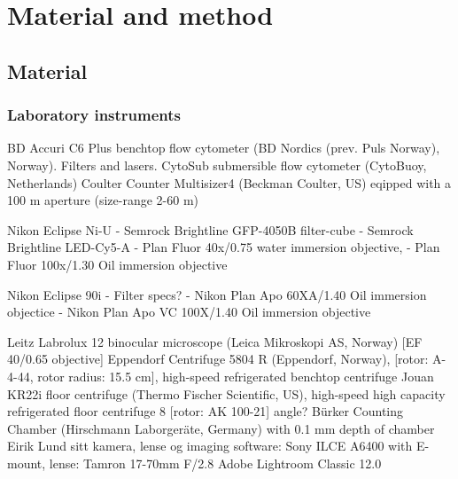 \chapter{Material and method}
\label{chap:m&m}

\section{Material}

\subsection{Laboratory instruments}
BD Accuri C6 Plus benchtop flow cytometer (BD Nordics (prev. Puls Norway), Norway). Filters and lasers.
CytoSub submersible flow cytometer (CytoBuoy, Netherlands)
Coulter Counter Multisizer4 (Beckman Coulter, US) eqipped with a 100 \micro m aperture (size-range 2-60 \micro m)

Nikon Eclipse Ni-U
- Semrock Brightline GFP-4050B filter-cube
- Semrock Brightline LED-Cy5-A
- Plan Fluor 40x/0.75 water immersion objective,
- Plan Fluor 100x/1.30 Oil immersion objective

Nikon Eclipse 90i
- Filter specs?
- Nikon Plan Apo 60XA/1.40 Oil immersion objectice
- Nikon Plan Apo VC 100X/1.40 Oil immersion objective

Leitz Labrolux 12 binocular microscope (Leica Mikroskopi AS, Norway) [EF 40/0.65 objective]
Eppendorf Centrifuge 5804 R (Eppendorf, Norway), [rotor: A-4-44, rotor radius: 15.5 cm], high-speed refrigerated benchtop centrifuge
Jouan KR22i floor centrifuge (Thermo Fischer Scientific, US), high-speed high capacity refrigerated floor centrifuge 8 [rotor: AK 100-21] angle?
Bürker Counting Chamber (Hirschmann Laborgeräte, Germany) with 0.1 mm depth of chamber
Eirik Lund sitt kamera, lense og imaging software: 
Sony ILCE A6400 with E-mount, lense: Tamron 17-70mm F/2.8 
Adobe\textsuperscript{\textregistered} Lightroom Classic 12.0 

